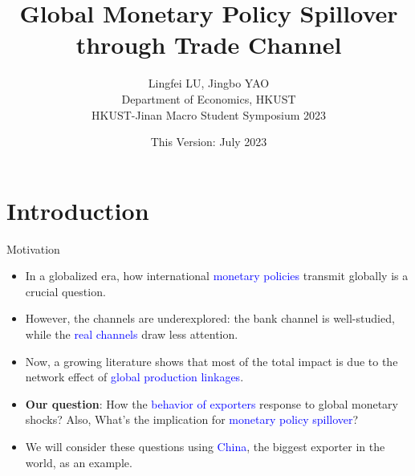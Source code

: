 \documentclass[10pt]{beamer}
\title[Monetary Policy Spillover through Trade Channel]{Global Monetary Policy Spillover through Trade Channel}
\author[Lu\&Yao (2023)]{\large Lingfei LU, Jingbo YAO \\ \vspace{0.5cm} Department of Economics, HKUST \\ \vspace{0.5cm} HKUST-Jinan Macro Student Symposium 2023}
\date{This Version: July 2023}
\begin{document}
	
    \begin{frame}[plain]
	\maketitle {}
    \end{frame}


\section{Introduction}

\begin{frame}{Motivation}



\begin{itemize}
\item In a globalized era, how international \textcolor{blue}{monetary policies} transmit globally is a crucial question.
\item However, the channels are underexplored: the bank channel is well-studied, while the \textcolor{blue}{real channels} draw less attention. 
\item Now, a growing literature shows that most of the total impact is due to the network effect of \textcolor{blue}{global production linkages}.
\item \textbf{Our question}: How the \textcolor{blue}{behavior of exporters} response to global monetary shocks? Also, What's the implication for \textcolor{blue}{monetary policy spillover}?
\item We will consider these questions using \textcolor{blue}{China}, the biggest exporter in the world, as an example. 
\end{itemize}

\end{frame}
\end{document}
